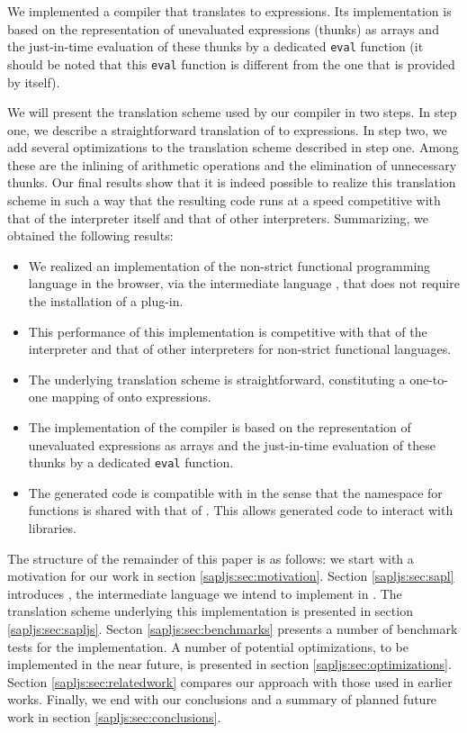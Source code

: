 We implemented a compiler that translates \Sapl to \JS expressions. Its
implementation is based on the representation of unevaluated expressions
(thunks) as \JS arrays and the just-in-time evaluation of these thunks by a
dedicated \texttt{eval} function (it should be noted that this \texttt{eval}
function is different from the one that is provided by \JS itself).

We will present the translation scheme used by our compiler in two steps.
In step one, we describe a straightforward translation of \Sapl to \JS
expressions. In step two, we add several optimizations to the translation
scheme described in step one. Among these are the inlining of arithmetic
operations and the elimination of unnecessary thunks. Our final results show
that it is indeed possible to realize this translation scheme in such a way that
the resulting code runs at a speed competitive with that of the \Sapl
interpreter itself and that of other interpreters. Summarizing, we obtained the
following results:

\begin{itemize}
\item We realized an implementation of the non-strict functional programming
      language \Clean in the browser, via the intermediate language \Sapl, that
      does not require the installation of a plug-in.
\item This performance of this implementation is competitive with that of the
      \Sapl interpreter and that of other interpreters for non-strict functional
      languages.
\item The underlying translation scheme is straightforward, constituting a
      one-to-one mapping of \Sapl onto \JS expressions.
\item The implementation of the compiler is based on the representation of
      unevaluated expressions as \JS arrays and the just-in-time evaluation of
      these thunks by a dedicated \texttt{eval} function.
\item The generated code is compatible with \JS in the sense that the namespace
      for functions is shared with that of \JS. This allows generated code to
      interact with \JS libraries.
\end{itemize}
The structure of the remainder of this paper is as follows: we start with a
motivation for our work in section \ref{sapljs:sec:motivation}. Section
\ref{sapljs:sec:sapl} introduces \Sapl, the intermediate language we intend to
implement in \JS. The translation scheme underlying this implementation is
presented in section \ref{sapljs:sec:sapljs}. Secton \ref{sapljs:sec:benchmarks}
presents a number of benchmark tests for the implementation. A number of
potential optimizations, to be implemented in the near future, is presented in
section \ref{sapljs:sec:optimizations}. Section \ref{sapljs:sec:relatedwork}
compares our approach with those used in earlier works. Finally, we end with our
conclusions and a summary of planned future work in section
\ref{sapljs:sec:conclusions}.

